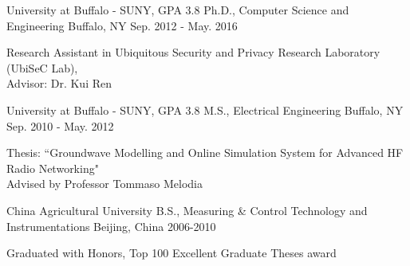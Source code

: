 \begin{cventries}
  \cventry
      {University at Buffalo - SUNY, GPA 3.8}
    {Ph.D., Computer Science and Engineering}
    {Buffalo, NY}
    {Sep. 2012 - May. 2016}
    {
      \begin{cvitems}
        \item {Research Assistant in Ubiquitous Security and Privacy Research Laboratory
(UbiSeC Lab), \\ 
Advisor: Dr. Kui Ren}
      \end{cvitems}
    }
\end{cventries}
\begin{cventries}
  \cventry
      {University at Buffalo - SUNY, GPA 3.8}
    {M.S., Electrical Engineering}
    {Buffalo, NY}
    {Sep. 2010 - May. 2012}
    {
      \begin{cvitems}
	 \item{Thesis: ``Groundwave Modelling and Online Simulation System for Advanced HF Radio Networking" \\
Advised by Professor Tommaso Melodia}
      \end{cvitems}
    }
\end{cventries}
\begin{cventries}
  \cventry
    {China Agricultural University}
        {B.S., Measuring \& Control Technology and Instrumentations}
    {Beijing, China}
    {2006-2010}
    {
      \begin{cvitems}
\item{Graduated with Honors, Top 100 Excellent Graduate Theses award}
	\end{cvitems}
    }
\end{cventries}
